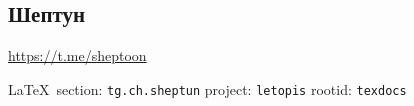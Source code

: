  
 
\subsection{Шептун}
\url{https://t.me/sheptoon}
  
\vspace{0.5cm}
 {\ifDEBUG\small\LaTeX~section: \verb|tg.ch.sheptun| project: \verb|letopis| rootid: \verb|texdocs|	\fi}
\vspace{0.5cm}


  
